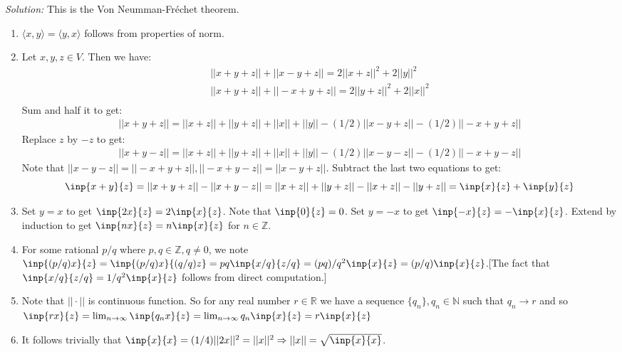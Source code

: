 \documentclass[a4paper, 11pt]{article}
\newenvironment{solution}
    {\textit{Solution:}}
    {}
\begin{document}
\begin{solution}
This is the Von Neumman-Fréchet theorem. 
\begin{enumerate}
    \item $\langle x,y\rangle=\langle y,x\rangle$ follows from properties of norm.
    \item Let $x,y,z\in V$. Then we have:
    \begin{align*}
       ||x+y+z||+||x-y+z||=2||x+z||^2+2||y||^2\\ 
       ||x+y+z||+||-x+y+z||=2||y+z||^2+2||x||^2\\ 
    \end{align*}
    Sum and half it to get:
    \begin{align*}
    ||x+y+z||= ||x+z||+||y+z||+||x||+||y||-(1/2)||x-y+z||-(1/2)||-x+y+z||   
    \end{align*}
    Replace $z$ by $-z$ to get:
    \begin{align*}
    ||x+y-z||= ||x+z||+||y+z||+||x||+||y||-(1/2)||x-y-z||-(1/2)||-x+y-z||   
    \end{align*}
    Note that $||x-y-z||=||-x+y+z||,||-x+y-z||=||x-y+z||$. Subtract the last two equations to get:
    $$\inp{x+y}{z}=||x+y+z||-||x+y-z||=||x+z||+||y+z||-||x+z||-||y+z||=\inp{x}{z}+\inp{y}{z}$$
    \item Set $y=x$ to get $\inp{2x}{z}=2\inp{x}{z}$. Note that $\inp{0}{z}=0$. Set $y=-x$ to get $\inp{-x}{z}=-\inp{x}{z}$. Extend by induction to get $\inp{nx}{z}=n\inp{x}{z}$ for $n\in\mathbb Z$.
    \item For some rational $p/q$ where $p,q\in\mathbb Z,q\ne0$, we note $\inp{(p/q)x}{z}=\inp{(p/q)x}{(q/q)z}=pq\inp{x/q}{z/q}=(pq)/q^2\inp{x}{z}=(p/q)\inp{x}{z}$.[The fact that $\inp{x/q}{z/q}=1/q^2\inp{x}{z}$ follows from direct computation.]
    \item Note that $||\cdot||$ is continuous function. So for any real number $r\in\mathbb{R}$ we have a sequence $\{q_n\},q_n\in\mathbb N$ such that $q_n\to r$ and so $\inp{rx}{z}=\lim_{n\to\infty}\inp{q_nx}{z}=\lim_{n\to\infty}q_n\inp{x}{z}=r\inp{x}{z}$ 
    \item It follows trivially that $\inp{x}{x}=(1/4)||2x||^2=||x||^2\Rightarrow||x||=\sqrt{\inp{x}{x}}$. 
\end{enumerate}
\end{solution} 
\end{document}
